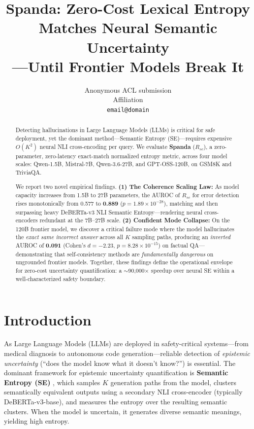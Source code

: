 \documentclass[11pt]{article}
\title{Spanda: Zero-Cost Lexical Entropy Matches Neural Semantic Uncertainty\\---Until Frontier Models Break It}
\author{Anonymous ACL submission \\
  Affiliation \\
  \texttt{email@domain} \\}
\begin{document}
\maketitle
\begin{abstract}
Detecting hallucinations in Large Language Models (LLMs) is critical for safe deployment, yet the dominant method---Semantic Entropy (SE)---requires expensive $O(K^2)$ neural NLI cross-encoding per query. We evaluate \textbf{Spanda} ($R_{sc}$), a zero-parameter, zero-latency exact-match normalized entropy metric, across four model scales: Qwen-1.5B, Mistral-7B, Qwen-3.6-27B, and GPT-OSS-120B, on GSM8K and TriviaQA.

We report two novel empirical findings. \textbf{(1) The Coherence Scaling Law:} As model capacity increases from 1.5B to 27B parameters, the AUROC of $R_{sc}$ for error detection rises monotonically from 0.577 to \textbf{0.889} ($p = 1.89 \times 10^{-28}$), matching and then surpassing heavy DeBERTa-v3 NLI Semantic Entropy---rendering neural cross-encoders redundant at the 7B--27B scale. \textbf{(2) Confident Mode Collapse:} On the 120B frontier model, we discover a critical failure mode where the model hallucinates the \textit{exact same incorrect answer} across all $K$ sampling paths, producing an \textit{inverted} AUROC of \textbf{0.091} (Cohen's $d = -2.23$, $p = 8.28 \times 10^{-15}$) on factual QA---demonstrating that self-consistency methods are \textit{fundamentally dangerous} on ungrounded frontier models. Together, these findings define the operational envelope for zero-cost uncertainty quantification: a $\sim$90,000$\times$ speedup over neural SE within a well-characterized safety boundary.
\end{abstract}

\section{Introduction}

As Large Language Models (LLMs) are deployed in safety-critical systems---from medical diagnosis to autonomous code generation---reliable detection of \textit{epistemic uncertainty} (``does the model know what it doesn't know?'') is essential. The dominant framework for epistemic uncertainty quantification is \textbf{Semantic Entropy (SE)} \cite{kuhn2023semantic}, which samples $K$ generation paths from the model, clusters semantically equivalent outputs using a secondary NLI cross-encoder (typically DeBERTa-v3-base), and measures the entropy over the resulting semantic clusters. When the model is uncertain, it generates diverse semantic meanings, yielding high entropy.
\end{document}
